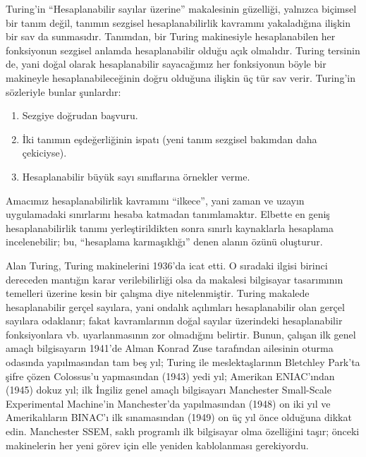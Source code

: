 \documentclass[../../../include/open-logic-section]{subfiles}
\begin{document}
\begin{digress}
Turing'in ``Hesaplanabilir sayılar üzerine'' makalesinin güzelliği, yalnızca
biçimsel bir tanım değil, tanımın sezgisel hesaplanabilirlik kavramını
yakaladığına ilişkin bir sav da sunmasıdır. Tanımdan, bir Turing makinesiyle
hesaplanabilen her fonksiyonun sezgisel anlamda hesaplanabilir olduğu açık
olmalıdır. Turing tersinin de, yani doğal olarak hesaplanabilir sayacağımız
her fonksiyonun böyle bir makineyle hesaplanabileceğinin doğru olduğuna
ilişkin üç tür sav verir. Turing'in sözleriyle bunlar şunlardır:
\begin{enumerate}
\item Sezgiye doğrudan başvuru.
\item İki tanımın eşdeğerliğinin ispatı (yeni tanım sezgisel bakımdan daha
  çekiciyse).
\item Hesaplanabilir büyük sayı sınıflarına örnekler verme.
\end{enumerate}
Amacımız hesaplanabilirlik kavramını ``ilkece'', yani zaman ve uzayın
uygulamadaki sınırlarını hesaba katmadan tanımlamaktır. Elbette en geniş
hesaplanabilirlik tanımı yerleştirildikten sonra sınırlı kaynaklarla hesaplama
incelenebilir; bu, ``hesaplama karmaşıklığı'' denen alanın özünü oluşturur.
\end{digress}

\begin{history}
Alan Turing, Turing makinelerini 1936'da icat etti. O sıradaki ilgisi birinci
dereceden mantığın karar verilebilirliği olsa da makalesi bilgisayar tasarımının
temelleri üzerine kesin bir çalışma diye nitelenmiştir. Turing makalede
hesaplanabilir gerçel sayılara, yani ondalık açılımları hesaplanabilir olan
gerçel sayılara odaklanır; fakat kavramlarının doğal sayılar üzerindeki
hesaplanabilir fonksiyonlara vb. uyarlanmasının zor olmadığını belirtir.
Bunun, çalışan ilk genel amaçlı bilgisayarın 1941'de Alman Konrad Zuse
tarafından ailesinin oturma odasında yapılmasından tam beş yıl; Turing ile
meslektaşlarının Bletchley Park'ta şifre çözen Colossus'u yapmasından (1943)
yedi yıl; Amerikan ENIAC'ından (1945) dokuz yıl; ilk İngiliz genel amaçlı
bilgisayarı Manchester Small-Scale Experimental Machine'in Manchester'da
yapılmasından (1948) on iki yıl ve Amerikalıların BINAC'ı ilk sınamasından
(1949) on üç yıl önce olduğuna dikkat edin. Manchester SSEM, saklı programlı
ilk bilgisayar olma özelliğini taşır; önceki makinelerin her yeni görev için
elle yeniden kablolanması gerekiyordu.
\end{history}
\end{document}
